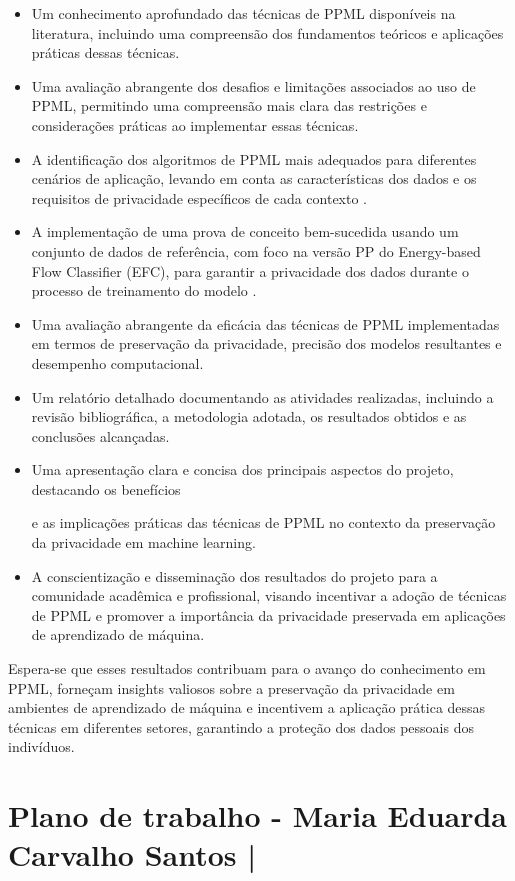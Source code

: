 \documentclass{article}
\begin{document}
\begin{itemize}
\item Um conhecimento aprofundado das técnicas de PPML disponíveis na literatura, incluindo uma compreensão dos fundamentos teóricos e aplicações práticas dessas técnicas.
\item Uma avaliação abrangente dos desafios e limitações associados ao uso de PPML, permitindo uma compreensão mais clara das restrições e considerações práticas ao implementar essas técnicas.
\item A identificação dos algoritmos de PPML mais adequados para diferentes cenários de aplicação, levando em conta as características dos dados e os requisitos de privacidade específicos de cada contexto \cite{9194237}.
\item A implementação de uma prova de conceito bem-sucedida usando um conjunto de dados de referência, com foco na versão PP do Energy-based Flow Classifier (EFC), para garantir a privacidade dos dados durante o processo de treinamento do modelo \cite{souza2022novel}.
\item Uma avaliação abrangente da eficácia das técnicas de PPML implementadas em termos de preservação da privacidade, precisão dos modelos resultantes e desempenho computacional.
\item Um relatório detalhado documentando as atividades realizadas, incluindo a revisão bibliográfica, a metodologia adotada, os resultados obtidos e as conclusões alcançadas.
\item Uma apresentação clara e concisa dos principais aspectos do projeto, destacando os benefícios

e as implicações práticas das técnicas de PPML no contexto da preservação da privacidade em machine learning.
\item A conscientização e disseminação dos resultados do projeto para a comunidade acadêmica e profissional, visando incentivar a adoção de técnicas de PPML e promover a importância da privacidade preservada em aplicações de aprendizado de máquina.
\end{itemize}

Espera-se que esses resultados contribuam para o avanço do conhecimento em PPML, forneçam insights valiosos sobre a preservação da privacidade em ambientes de aprendizado de máquina e incentivem a aplicação prática dessas técnicas em diferentes setores, garantindo a proteção dos dados pessoais dos indivíduos.

\section{Plano de trabalho - Maria Eduarda Carvalho Santos | }
\end{document}
